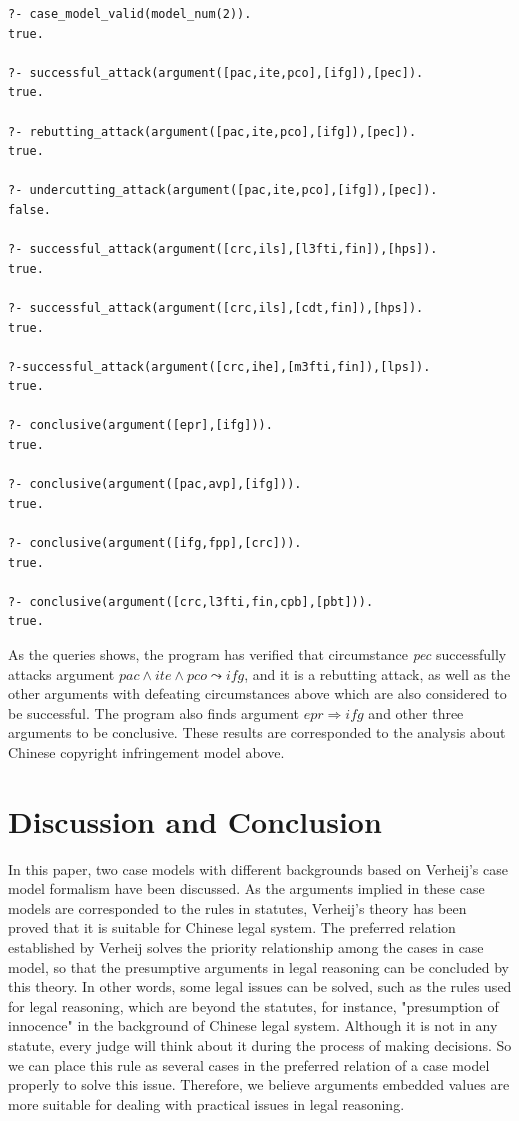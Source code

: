 \documentclass{IOS-Book-Article}
\begin{document}
\begin{lstlisting}
?- case_model_valid(model_num(2)).
true.

?- successful_attack(argument([pac,ite,pco],[ifg]),[pec]).
true.

?- rebutting_attack(argument([pac,ite,pco],[ifg]),[pec]).
true.

?- undercutting_attack(argument([pac,ite,pco],[ifg]),[pec]).
false.

?- successful_attack(argument([crc,ils],[l3fti,fin]),[hps]).
true.

?- successful_attack(argument([crc,ils],[cdt,fin]),[hps]).
true.

?-successful_attack(argument([crc,ihe],[m3fti,fin]),[lps]).
true.

?- conclusive(argument([epr],[ifg])).
true.

?- conclusive(argument([pac,avp],[ifg])).
true.

?- conclusive(argument([ifg,fpp],[crc])).
true.

?- conclusive(argument([crc,l3fti,fin,cpb],[pbt])).
true.
\end{lstlisting}

As the queries shows, the program has verified that circumstance \textit{pec} successfully attacks argument $pac \wedge ite \wedge pco \leadsto ifg$, and it is a rebutting attack, as well as the other arguments with defeating circumstances above which are also considered to be successful. The program also finds argument $epr \Rightarrow ifg$ and other three arguments to be conclusive. These results are corresponded to the analysis about Chinese copyright infringement model above.

\section{Discussion and Conclusion}

\noindent In this paper, two case models with different backgrounds based on Verheij's case model formalism have been discussed. As the arguments implied in these case models are corresponded to the rules in statutes, Verheij's theory has been proved that it is suitable for Chinese legal system. The preferred relation established by Verheij solves the priority relationship among the cases in case model, so that the presumptive arguments in legal reasoning can be concluded by this theory. In other words, some legal issues can be solved, such as the rules used for legal reasoning, which are beyond the statutes, for instance, "presumption of innocence" in the background of Chinese legal system. Although it is not in any statute, every judge will think about it during the process of making decisions. So we can place this rule as several cases in the preferred relation of a case model properly to solve this issue. Therefore, we believe arguments embedded values are more suitable for dealing with practical issues in legal reasoning. 
\end{document}
